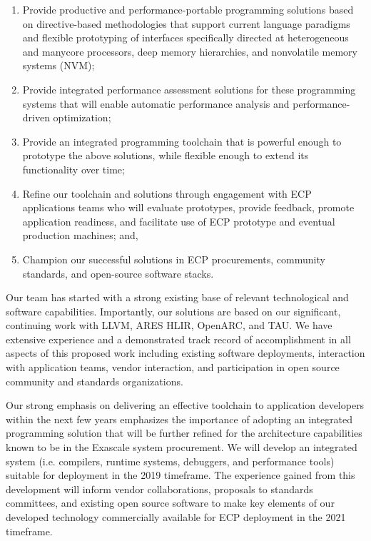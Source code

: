 \begin{enumerate}
    
    \item Provide productive and performance-portable programming solutions based on directive-based methodologies that support current language paradigms and flexible prototyping of interfaces specifically directed at heterogeneous and manycore processors, deep memory hierarchies, and nonvolatile memory systems (NVM);
    
    \item Provide integrated performance assessment solutions for these programming systems that will enable automatic performance analysis and performance-driven optimization;
    
    \item Provide an integrated programming toolchain that is powerful enough to prototype the above solutions, while flexible enough to extend its functionality over time;
    
    \item Refine our toolchain and solutions through engagement with ECP applications teams who will evaluate prototypes, provide feedback, promote application readiness, and facilitate use of ECP prototype and eventual production machines; and,
    
    \item Champion our successful solutions in ECP procurements, community standards, and open-source software stacks.
    
\end{enumerate}

Our team has started with a strong existing base of relevant technological and software capabilities. Importantly, our solutions are based on our significant, continuing work with LLVM, ARES HLIR, OpenARC, and TAU. We have extensive experience and a demonstrated track record of accomplishment in all aspects of this proposed work including existing software deployments, interaction with application teams, vendor interaction, and participation in open source community and standards organizations.

Our strong emphasis on delivering an effective toolchain to application developers within the next few years emphasizes the importance of adopting an integrated programming solution that will be further refined for the architecture capabilities known to be in the Exascale system procurement. We will develop an integrated system (i.e. compilers, runtime systems, debuggers, and performance tools) suitable for deployment in the 2019 timeframe. The experience gained from this development will inform vendor collaborations, proposals to standards committees, and existing open source software to make key elements of our developed technology commercially available for ECP deployment in the 2021 timeframe.

